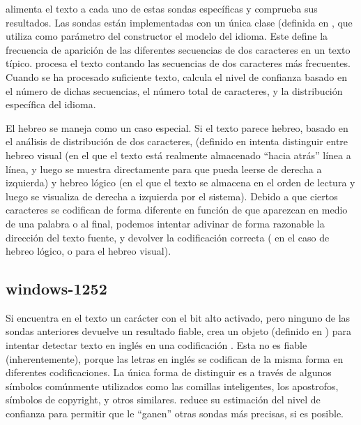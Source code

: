  alimenta el texto a cada uno de estas sondas específicas y comprueba sus resultados. Las sondas están implementadas con un única clase  (definida en , que utiliza como parámetro del constructor el modelo del idioma. Este define la frecuencia de aparición de las diferentes secuencias de dos caracteres en un texto típico.  procesa el texto contando las secuencias de dos caracteres más frecuentes. Cuando se ha procesado suficiente texto, calcula el nivel de confianza basado en el número de dichas secuencias, el número total de caracteres, y la distribución específica del idioma.

El hebreo se maneja como un caso especial. Si el texto parece hebreo, basado en el análisis de distribución de dos caracteres,  (definido en  intenta distinguir entre hebreo visual (en el que el texto está realmente almacenado ``hacia atrás'' línea a línea, y luego se muestra directamente para que pueda leerse de derecha a izquierda) y hebreo lógico (en el que el texto se almacena en el orden de lectura y luego se visualiza de derecha a izquierda por el sistema). Debido a que ciertos caracteres se codifican de forma diferente en función de que aparezcan en medio de una palabra o al final, podemos intentar adivinar de forma razonable la dirección del texto fuente, y devolver la codificación correcta ( en el caso de hebreo lógico, o  para el hebreo visual).

\subsection{windows-1252}

Si  encuentra en el texto un carácter con el bit alto activado, pero ninguno de las sondas anteriores devuelve un resultado fiable, crea un objeto  (definido en ) para intentar detectar texto en inglés en una codificación . Esta no es fiable (inherentemente), porque las letras en inglés se codifican de la misma forma en diferentes codificaciones. La única forma de distinguir  es a través de algunos símbolos comúnmente utilizados como las comillas inteligentes, los apostrofos, símbolos de copyright, y otros similares.  reduce su estimación del nivel de confianza para permitir que le ``ganen'' otras sondas más precisas, si es posible.

